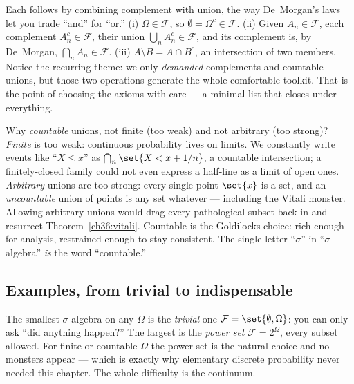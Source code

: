 \begin{whybox}
Each follows by combining complement with union, the way De~Morgan's laws let you
trade ``and'' for ``or.''
(i) $\Omega \in \mathcal{F}$, so $\emptyset = \Omega^c \in \mathcal{F}$.
(ii) Given $A_n \in \mathcal{F}$, each complement $A_n^c \in \mathcal{F}$, their
union $\bigcup_n A_n^c \in \mathcal{F}$, and its complement is, by De~Morgan,
$\bigcap_n A_n \in \mathcal{F}$.
(iii) $A \setminus B = A \cap B^c$, an intersection of two members.
Notice the recurring theme: we only \emph{demanded} complements and countable
unions, but those two operations generate the whole comfortable toolkit. That is
the point of choosing the axioms with care --- a minimal list that closes under
everything.
\end{whybox}

\begin{focusbox}
Why \emph{countable} unions, not finite (too weak) and not arbitrary (too strong)?
\emph{Finite} is too weak: continuous probability lives on limits. We constantly
write events like ``$X \le x$'' as $\bigcap_n \set{X < x + 1/n}$, a countable
intersection; a finitely-closed family could not even express a half-line as a
limit of open ones. \emph{Arbitrary} unions are too strong: every single point
$\set{x}$ is a set, and an \emph{uncountable} union of points is any set whatever
--- including the Vitali monster. Allowing arbitrary unions would drag every
pathological subset back in and resurrect Theorem~\ref{ch36:vitali}. Countable is
the Goldilocks choice: rich enough for analysis, restrained enough to stay
consistent. The single letter ``$\sigma$'' in ``$\sigma$-algebra'' \emph{is} the
word ``countable.''
\end{focusbox}

\subsection{Examples, from trivial to indispensable}

\begin{example}
\label{ch36:extremes}
The smallest $\sigma$-algebra on any $\Omega$ is the \emph{trivial} one
$\mathcal{F} = \set{\emptyset, \Omega}$: you can only ask ``did anything happen?''
The largest is the \emph{power set} $\mathcal{F} = 2^{\Omega}$, every subset
allowed. For finite or countable $\Omega$ the power set is the natural choice and
no monsters appear --- which is exactly why elementary discrete probability never
needed this chapter. The whole difficulty is the continuum.
\end{example}

